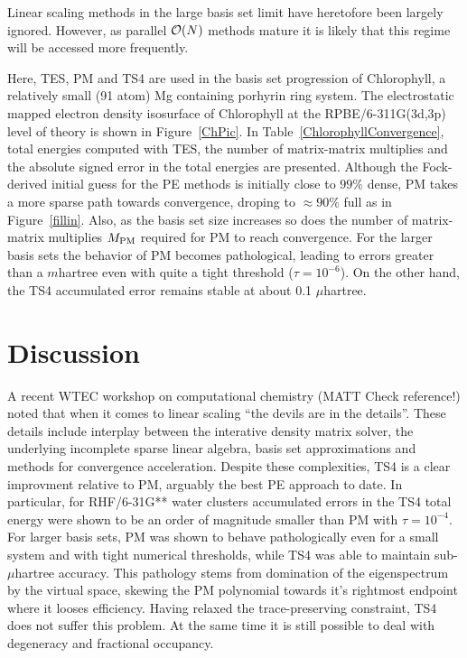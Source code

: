 \commentoutA{\documentclass[prb,aps,twocolumn,twocolumngrid,secnumarabic,superbib,hyperref]{revtex4}}
\begin{document}
{Linear scaling methods in the large basis set limit have heretofore been largely
ignored.  However, as parallel ${\cal O}(N)$ methods mature it is likely that  this 
regime will be accessed more frequently.

Here, TES, PM and TS4 are used in the basis set progression 
of Chlorophyll, a relatively small (91 atom) Mg containing porhyrin ring system. 
The electrostatic mapped electron density isosurface of Chlorophyll at the
RPBE/6-311G(3d,3p) level of theory is shown in Figure~\ref{ChPic}. 
In Table~\ref{ChlorophyllConvergence}, total energies computed with TES, the number 
of matrix-matrix multiplies and the absolute signed error in the total energies are 
presented.  Although the Fock-derived initial guess for the PE methods is initially 
close to $99\%$ dense, PM takes a more sparse path towards convergence, 
droping to $\approx 90\%$ full as in Figure~\ref{fillin}.  Also, as the basis set 
size increases so does the number of matrix-matrix multiplies $M_{\rm PM}$ required 
for PM to reach convergence. For the larger basis sets the behavior of PM becomes 
pathological,  leading to errors greater than a $m$hartree even with quite a tight
threshold ($\tau=10^{-6}$).  On the other hand, the TS4 accumulated error remains
stable at about 0.1 $\mu$hartree.

\section{Discussion}

A recent WTEC workshop on computational chemistry \cite{WTEC00} (MATT Check reference!) noted that when it comes
to linear scaling ``the devils are in the details''. These details include
interplay between the interative density matrix solver, the underlying incomplete sparse 
linear algebra, basis set approximations and methods for convergence acceleration.   
Despite these complexities, TS4 is a clear improvment relative to PM, arguably the best 
PE approach to date.  
In particular,  for RHF/6-31G** water clusters accumulated errors in the TS4 total energy 
were shown to be an order of magnitude smaller than PM with $\tau=10^{-4}$.  
For larger basis sets, PM was shown to behave pathologically even 
for a small system and with tight numerical thresholds, while TS4 was able to maintain
sub-$\mu$hartree accuracy.  This pathology stems from domination of the eigenspectrum
by the virtual space, skewing the PM polynomial towards it's rightmost endpoint 
where it looses efficiency.   Having relaxed the trace-preserving constraint, TS4
does not suffer this problem.  
At the same time it is still possible to deal with degeneracy and fractional occupancy.

}
\end{document}
